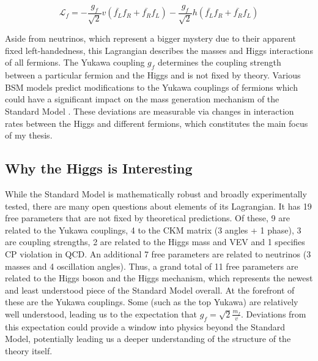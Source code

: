 \begin{equation}
\mathcal{L}_f = -\frac{g_f}{\sqrt{2}}v(\bar{f_L}f_R + \bar{f_R}f_L) - 
\frac{g_f}{\sqrt{2}}h(\bar{f_L}f_R + \bar{f_R}f_L)
\end{equation}

Aside from neutrinos, which represent a bigger mystery due to their apparent fixed left-handedness, this 
Lagrangian describes the masses and Higgs interactions of all fermions. The Yukawa coupling 
$g_f$ determines the coupling strength between a particular fermion and the Higgs and is not fixed by 
theory. Various BSM models predict modifications to the Yukawa couplings of fermions which could have a 
significant impact on the mass generation mechanism of the Standard Model 
\cite{gunion-2hdm, carena-mssm}. These deviations are measurable via changes in interaction rates 
between the Higgs and different fermions, which constitutes the main focus of my thesis.

\subsection{Why the Higgs is Interesting}

While the Standard Model is mathematically robust and broadly experimentally tested, there are many open 
questions about elements of its Lagrangian. It has 19 free parameters that are not fixed by theoretical 
predictions. Of these, 9 are related to the Yukawa couplings, 4 to the CKM matrix (3 angles + 1 phase), 3 are 
coupling strengths, 2 are related to the Higgs mass and VEV and 1 specifies CP violation in QCD. An additional 7 
free parameters are related to neutrinos (3 masses and 4 oscillation angles). Thus, a grand total of 11 free 
parameters are related to the Higgs boson and the Higgs mechanism, which represents the newest and least 
understood piece of the Standard Model overall. At the forefront of these are the Yukawa couplings. Some 
(such as the top Yukawa) are relatively well understood, leading us to the expectation that 
$g_f = \sqrt{2}\frac{m_f}{v}$. Deviations from this expectation could provide a window into physics beyond 
the Standard Model, potentially leading us a deeper understanding of the structure of the theory itself.  \par

